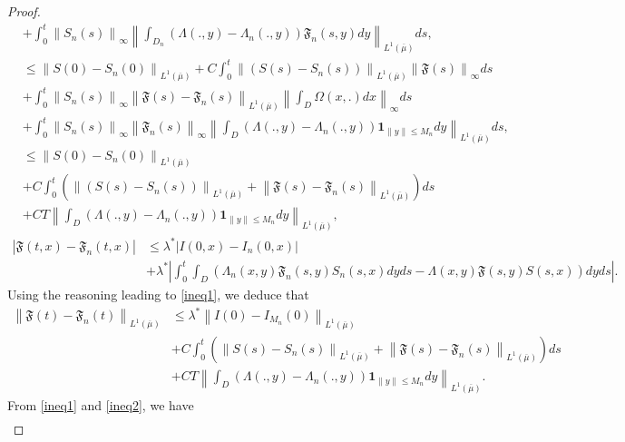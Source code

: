 \documentclass[notitlepage,reqno,11pt]{amsart}
\numberwithin{equation}{section}
\begin{document}
\begin{proof}
\begin{align}
&+ \int_0^t\left\| S_n(s)\right\|_{\infty}\left\|\int_{D_{n}}\left(\Lambda(.,y)-\Lambda_{n}(.,y)\right)\mathfrak{F}_{n}(s,y)dy\right\|_{L^1 (\overline{\mu})}ds,\nonumber\\
&\leq \left\|S(0)-S_{n}(0)\right\|_{L^1 (\overline{\mu})}+C\int_0^t\left\| (S(s)-S_{n}(s))\right\|_{L^1 (\overline{\mu})}\left\|\mathfrak{F}(s)\right\|_{\infty}ds\nonumber\\
&+\int_0^t \left\|S_{n}(s)\right\|_{\infty}\left\|\mathfrak{F}(s)-\mathfrak{F}_{n}(s)\right\|_{L^1 (\overline{\mu})}\left\|\int_{D} \Omega(x,.) dx\right\|_{\infty}ds\nonumber\\
&+ \int_0^t\left\| S_{n}(s)\right\|_{\infty}\left\| \mathfrak{F}_{n}(s)\right\|_{\infty}\left\|\int_{D}\left(\Lambda(.,y)-\Lambda_{n}(.,y)\right)\mathbf{1}_{\|y\|\leq M_n}dy\right\|_{L^1 (\overline{\mu})}ds,\nonumber\\
&\leq \left\|S(0)-S_{n}(0)\right\|_{L^1 (\overline{\mu})}\nonumber \\
&+C\int_0^t\left(\left\| (S(s)-S_{n}(s))\right\|_{L^1 (\overline{\mu})}+\left\|\mathfrak{F}(s)-\mathfrak{F}_{n}(s)\right\|_{L^1 (\overline{\mu})}\right)ds\nonumber\\
\label{ineq1}
&+CT\left\|\int_{D}\left(\Lambda(.,y)-\Lambda_{n}(.,y)\right)\mathbf{1}_{\|y\|\leq M_n}dy\right\|_{L^1 (\overline{\mu})},
\end{align}
\begin{align*}
\left|\mathfrak{F}(t,x)-\mathfrak{F}_{n}(t,x)\right|&\leq \lambda^*\left|I(0,x)- I_{n}(0,x)\right|\\
&+\lambda^*\left|\int_0^t\int_{D}\left( \Lambda_{n}(x,y)\mathfrak{F}_{n}(s,y)S_{n}(s,x)dyds- \Lambda(x,y)\mathfrak{F}(s,y)S(s,x)\right)dyds\right|.
\end{align*}
Using the reasoning leading to \eqref{ineq1}, we deduce that
\begin{align}
\left\|\mathfrak{F}(t)-\mathfrak{F}_{n}(t)\right\|_{L^1 (\overline{\mu})}&\leq \lambda^*\left\|I(0)- I_{M_n}(0)\right\|_{L^1 (\overline{\mu})}\nonumber\\
&+C\int_0^t\left(\left\| S(s)-S_{n}(s)\right\|_{L^1 (\overline{\mu})}+\left\|\mathfrak{F}(s)-\mathfrak{F}_{n}(s)\right\|_{L^1 (\overline{\mu})}\right)ds\nonumber\\
\label{ineq2}
&+CT\left\|\int_{D}\left(\Lambda(.,y)-\Lambda_{n}(.,y)\right)\mathbf{1}_{\|y\|\leq M_n}dy\right\|_{L^1 (\overline{\mu})}.
\end{align}
From \eqref{ineq1} and \eqref{ineq2}, we have
\begin{align}

\end{align}
\end{proof}
\end{document}

